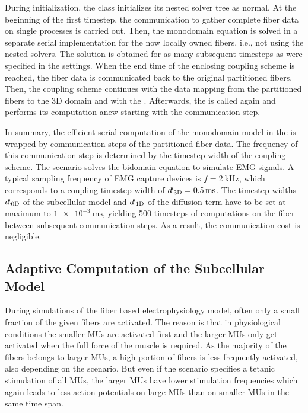 During initialization, the  class initializes its nested solver tree as normal. At the beginning of the first timestep, the communication to gather complete fiber data on single processes is carried out. Then, the monodomain equation is solved in a separate serial implementation for the now locally owned fibers, i.e., not using the nested solvers. The solution is obtained for as many subsequent timesteps as were specified in the settings. When the end time of the enclosing coupling scheme is reached, the fiber data is communicated back to the original partitioned fibers. Then, the coupling scheme continues with the data mapping from the partitioned fibers to the 3D domain and with the . Afterwards, the  is called again and performs its computation anew starting with the communication step.

In summary, the efficient serial computation of the monodomain model in the  is wrapped by communication steps of  the partitioned fiber data. The frequency of this communication step is determined by the timestep width of the coupling scheme. 
The scenario solves the bidomain equation to simulate EMG signals. A typical sampling frequency of EMG capture devices is $f=\SI{2}{\kilo\hertz}$, which corresponds to a coupling timestep width of $\dt_\text{3D}=\SI{0.5}{\milli\second}$. The timestep widths $\dt_\text{0D}$ of the subcellular model and $\dt_\text{1D}$ of the diffusion term have to be set at maximum to $\SI{1e-3}{\milli\second}$, yielding \num{500} timesteps of computations on the fiber between subsequent communication steps. As a result, the communication cost is negligible.

\subsection{Adaptive Computation of the Subcellular Model}\label{sec:adaptive_computation_for_fiber_based}

During simulations of the fiber based electrophysiology model, often only a small fraction of the given fibers are activated.
The reason is that in physiological conditions the smaller MUs are activated first and the larger MUs only get activated when the full force of the muscle is required. As the majority of the fibers belongs to larger MUs, a high portion of fibers is less frequently activated, also depending on the scenario.
But even if the scenario specifies a tetanic stimulation of all MUs, the larger MUs have lower stimulation frequencies which again leads to less action potentials on large MUs than on smaller MUs in the same time span.

